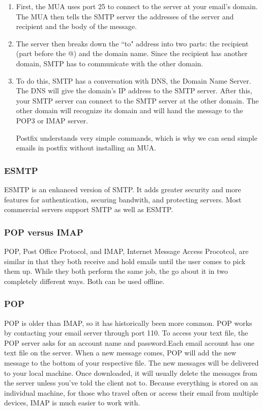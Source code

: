 \documentclass{article}
\begin{document}
\begin{enumerate}

\item First, the MUA uses port 25 to connect to the server at your email's domain. The MUA then tells the SMTP server the addresses of the server and recipient and the body of the message.

\item The server then breaks down the ``to" address into two parts: the recipient (part before the @) and the domain name. Since the recipient has another domain, SMTP has to communicate with the other domain.

\item To do this, SMTP has a conversation with DNS, the Domain Name Server. The DNS will give the domain's IP address to the SMTP server. After this, your SMTP server can connect to the SMTP server at the other domain. The other domain will recognize its domain and will hand the message to the POP3 or IMAP server.

Postfix understands very simple commands, which is why we can send simple emails in postfix without installing an MUA.
\end{enumerate}

\subsubsection*{ESMTP}

\indent\indent ESMTP is an enhanced version of SMTP. It adds greater security and more features for authentication, securing bandwith, and protecting servers. Most commercial servers support SMTP as well as ESMTP.

\subsubsection*{POP versus IMAP}

\indent\indent POP, Post Office Protocol, and IMAP, Internet Message Access Procotcol, are similar in that they both receive and hold emails until the user comes to pick them up. While they both perform the same job, the go about it in two completely different ways. Both can be used offline.

\subsubsection*{POP}

\indent\indent POP is older than IMAP, so it has historically been more common. POP works by contacting your email server through port 110. To access your text file, the POP server asks for an account name and password.Each email account has one text file on the server. When a new message comes, POP will add the new message to the bottom of your respective file. The new messages will be delivered to your local machine. Once downloaded, it will usually delete the messages from the server unless you've told the client not to. Because everything is stored on an individual machine, for those who travel often or access their email from multiple devices, IMAP is much easier to work with.
\end{document}
